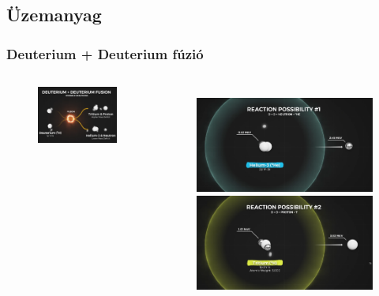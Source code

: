 \documentclass{beamer}
\begin{document}
\subsection{Üzemanyag}
\begin{frame}
    \frametitle{Deuterium + Deuterium fúzió}
    \begin{columns}
        \begin{figure}
            \includegraphics[scale=0.2]{d_d_fusion_v2.png}
        \end{figure}   
        \begin{figure}
            \includegraphics[scale=0.08]{d_d_fusion_possibility_1.png}
            \includegraphics[scale=0.08]{d_d_fusion_possibility_2.png}
        \end{figure}   
    \end{columns}
\end{frame}
\end{document}
